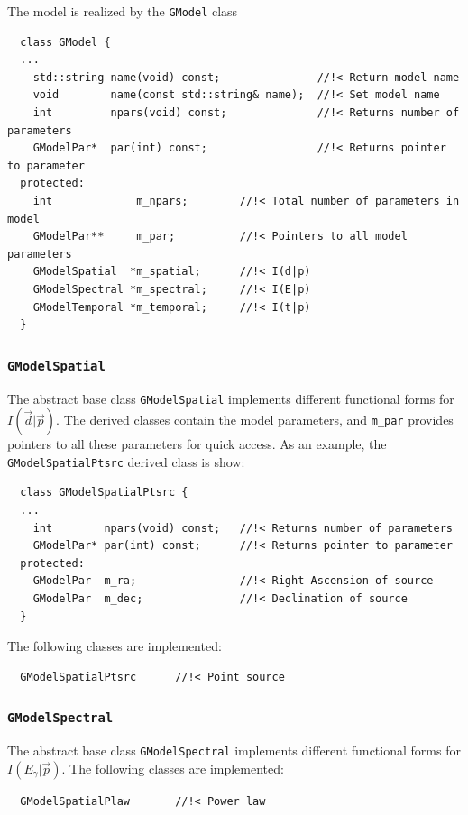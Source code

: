 \documentclass{article}[12pt,a4]
\begin{document}
The model is realized by the {\tt GModel} class
\begin{verbatim}
  class GModel {
  ...
    std::string name(void) const;               //!< Return model name
    void        name(const std::string& name);  //!< Set model name
    int         npars(void) const;              //!< Returns number of parameters
    GModelPar*  par(int) const;                 //!< Returns pointer to parameter
  protected:
    int             m_npars;        //!< Total number of parameters in model
    GModelPar**     m_par;          //!< Pointers to all model parameters
    GModelSpatial  *m_spatial;      //!< I(d|p)
    GModelSpectral *m_spectral;     //!< I(E|p)
    GModelTemporal *m_temporal;     //!< I(t|p)
  }
\end{verbatim}


\subsubsection{{\tt GModelSpatial}}

The abstract base class {\tt GModelSpatial} implements different functional forms for 
$I(\vec{d} | \vec{p})$.
The derived classes contain the model parameters, and {\tt m\_par} provides pointers
to all these parameters for quick access.
As an example, the {\tt GModelSpatialPtsrc} derived class is show:
\begin{verbatim}
  class GModelSpatialPtsrc {
  ...
    int        npars(void) const;   //!< Returns number of parameters
    GModelPar* par(int) const;      //!< Returns pointer to parameter
  protected:
    GModelPar  m_ra;                //!< Right Ascension of source
    GModelPar  m_dec;               //!< Declination of source
  }
\end{verbatim}
The following classes are implemented:
\begin{verbatim}
  GModelSpatialPtsrc      //!< Point source
\end{verbatim}


\subsubsection{{\tt GModelSpectral}}

The abstract base class {\tt GModelSpectral} implements different functional forms for 
$I(E_{\gamma} | \vec{p})$.
The following classes are implemented:
\begin{verbatim}
  GModelSpatialPlaw       //!< Power law
\end{verbatim}
\end{document}

